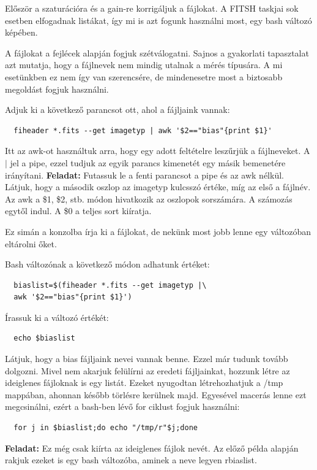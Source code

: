 \documentclass{article}
\begin{document}
Először a szaturációra és a gain-re korrigáljuk a fájlokat. A FITSH taskjai sok
esetben elfogadnak listákat, így mi is azt fogunk használni most, egy bash
változó képében.

A fájlokat a fejlécek alapján fogjuk szétválogatni. Sajnos a gyakorlati
tapasztalat azt mutatja, hogy a fájlnevek nem mindig utalnak a mérés típusára.
A mi esetünkben ez nem így van szerencsére, de mindenesetre most a biztosabb
megoldást fogjuk használni.

Adjuk ki a következő parancsot ott, ahol a fájljaink vannak:
\begin{verbatim}
  fiheader *.fits --get imagetyp | awk '$2=="bias"{print $1}'
\end{verbatim}

Itt az awk-ot használtuk arra, hogy egy adott feltételre leszűrjük a
fájlneveket. A $|$ jel a pipe, ezzel tudjuk az egyik parancs kimenetét egy
másik bemenetére irányítani.
{\bf Feladat:}
Futassuk le a fenti parancsot a pipe és az awk nélkül. Látjuk, hogy a második
oszlop az imagetyp kulcsszó értéke, míg az első a fájlnév. Az awk a \$1, \$2,
stb. módon hivatkozik az oszlopok sorszámára. A számozás egytől indul. A \$0 a
teljes sort kiíratja.

Ez simán a konzolba írja ki a fájlokat, de nekünk most jobb lenne egy
változóban eltárolni őket.

Bash változónak a következő módon adhatunk értéket:
\begin{verbatim}
  biaslist=$(fiheader *.fits --get imagetyp |\
  awk '$2=="bias"{print $1}')
\end{verbatim}

Írassuk ki a változó értékét:
\begin{verbatim}
  echo $biaslist
\end{verbatim}

Látjuk, hogy a bias fájljaink nevei vannak benne. Ezzel már tudunk tovább
dolgozni.
Mivel nem akarjuk felülírni az eredeti fájljainkat, hozzunk létre az ideiglenes
fájloknak is egy listát. Ezeket nyugodtan létrehozhatjuk a /tmp mappában,
ahonnan később törlésre kerülnek majd.
Egyesével macerás lenne ezt megcsinálni, ezért a bash-ben lévő for ciklust
fogjuk használni:

\begin{verbatim}
  for j in $biaslist;do echo "/tmp/r"$j;done
\end{verbatim}

{\bf Feladat:}
Ez még csak kiírta az ideiglenes fájlok nevét. Az előző példa alapján rakjuk
ezeket is egy bash változóba, aminek a neve legyen rbiaslist.
\end{document}
